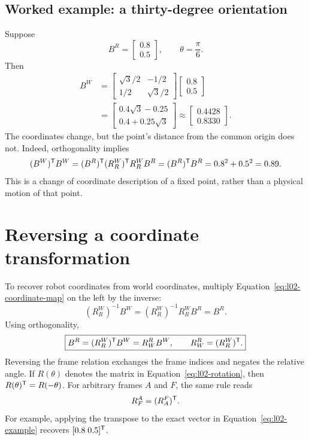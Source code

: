\subsection{Worked example: a thirty-degree orientation}
Suppose
\[
 B^R=\begin{bmatrix}0.8\\0.5\end{bmatrix},\qquad \theta=\frac{\pi}{6}.
\]
Then
\begin{align}
 B^W
 &=\begin{bmatrix}\sqrt3/2&-1/2\\1/2&\sqrt3/2\end{bmatrix}
   \begin{bmatrix}0.8\\0.5\end{bmatrix}\\
 &=\begin{bmatrix}0.4\sqrt3-0.25\\0.4+0.25\sqrt3\end{bmatrix}
 \approx\begin{bmatrix}0.4428\\0.8330\end{bmatrix}.
 \label{eq:l02-example}
\end{align}
The coordinates change, but the point's distance from the common origin does
not. Indeed, orthogonality implies
\[
 (B^W)^{\mathsf T} B^W=(B^R)^{\mathsf T}(R_R^W)^{\mathsf T} R_R^W B^R
 =(B^R)^{\mathsf T} B^R=0.8^2+0.5^2=0.89.
\]
This is a change of coordinate description of a fixed point, rather than a
physical motion of that point.

\section{Reversing a coordinate transformation}
To recover robot coordinates from world coordinates, multiply
Equation~\eqref{eq:l02-coordinate-map} on the left by the inverse:
\[
 (R_R^W)^{-1}B^W=(R_R^W)^{-1}R_R^W B^R=B^R.
\]
Using orthogonality,
\begin{equation}
 \boxed{B^R=(R_R^W)^{\mathsf T} B^W=R_W^R B^W,\qquad
 R_W^R=(R_R^W)^{\mathsf T}.}
\end{equation}
Reversing the frame relation exchanges the frame indices and negates the
relative angle. If $R(\theta)$ denotes the matrix in
Equation~\eqref{eq:l02-rotation}, then $R(\theta)^{\mathsf T}=R(-\theta)$.
For arbitrary frames $A$ and $F$, the same rule reads
\begin{equation}
 R_F^A=(R_A^F)^{\mathsf T}.
 \label{eq:l02-swap}
\end{equation}
For example, applying the transpose to the exact vector in
Equation~\eqref{eq:l02-example} recovers $[0.8\;0.5]^{\mathsf T}$.

